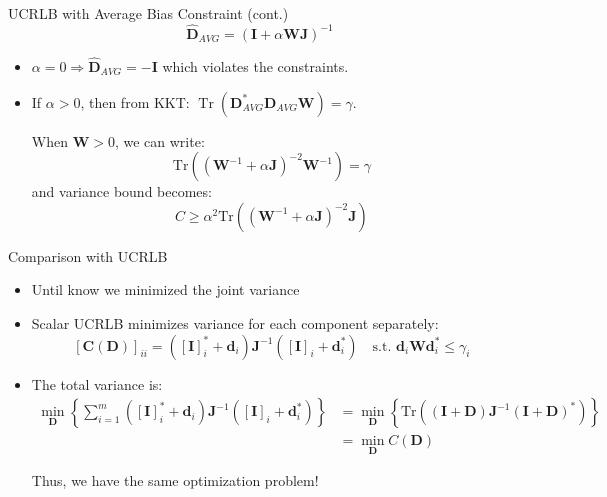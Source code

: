 \documentclass{beamer}
\begin{document}
\begin{frame}{UCRLB with Average Bias Constraint (cont.)}
    \[
    \hat{\mathbf{D}}_{AVG} = (\mathbf{I} + \alpha \mathbf{W J})^{-1}
    \]
    \begin{itemize}
        \item $\alpha = 0 \Rightarrow \hat{\mathbf{D}}_{AVG} = -\mathbf{I}$ which violates the constraints.
        \item If $\alpha > 0$, then from KKT: 
        $\operatorname{Tr}(\mathbf{D}_{AVG}^*\mathbf{D}_{AVG} \mathbf{W}) = \gamma$.
        
        When $\mathbf{W} > 0$, we can write:
        \[
        \text{Tr}\left((\mathbf{W}^{-1} + \alpha\mathbf{J})^{-2}\mathbf{W}^{-1}\right) = \gamma
        \]
        and variance bound becomes:
        \[
        C \geq \alpha^2\text{Tr}\left((\mathbf{W}^{-1} + \alpha\mathbf{J})^{-2}\mathbf{J}\right)
        \]
    \end{itemize}
\end{frame}


\begin{frame}{Comparison with UCRLB}
\begin{itemize}
    \item Until know we minimized the joint variance
    \item Scalar UCRLB minimizes variance for each component separately:
    \[
    \left[\mathbf{C}(\mathbf{D})\right]_{ii} = (\left[\mathbf{I}\right]_i^* + \mathbf{d}_i)\mathbf{J}^{-1}
    (\left[\mathbf{I}\right]_i + \mathbf{d}_i^*) \quad \text{s.t. } \mathbf{d}_i \mathbf{W} \mathbf{d}_i^* 
    \leq \gamma_i
    \]
    \item The total variance is:
    \begin{align*}
    \min_{\mathbf{D}} \left\{ \sum_{i=1}^{m} (\left[\mathbf{I}\right]_i^* + \mathbf{d}_i)\mathbf{J}^{-1}(\left[\mathbf{I}\right]_i +
    \mathbf{d}_i^*) \right\}
    &= \min_{\mathbf{D}} \left\{ \text{Tr}\left((\mathbf{I}+\mathbf{D})\mathbf{J}^{-1}(\mathbf{I} +
    \mathbf{D})^*\right) \right\} \\
    &= \min_{\mathbf{D}} C(\mathbf{D})
    \end{align*}

    Thus, we have the same optimization problem!
    
\end{itemize}
\end{frame}
\end{document}
